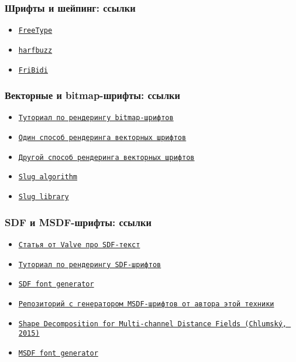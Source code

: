 \documentclass{beamer}
\begin{document}
\begin{frame}[fragile]
\frametitle{Шрифты и шейпинг: ссылки}
\begin{itemize}
\item \href{https://freetype.org}{\texttt{FreeType}}
\item \href{https://harfbuzz.github.io}{\texttt{harfbuzz}}
\item \href{https://github.com/fribidi/fribidi}{\texttt{FriBidi}}
\end{itemize}
\end{frame}

\begin{frame}[fragile]
\frametitle{Векторные и bitmap-шрифты: ссылки}
\begin{itemize}
\item \href{https://learnopengl.com/In-Practice/Text-Rendering}{\texttt{Туториал по рендерингу bitmap-шрифтов}}
\item \href{https://wdobbie.com/post/gpu-text-rendering-with-vector-textures}{\texttt{Один способ рендеринга векторных шрифтов}}
\item \href{https://medium.com/@evanwallace/easy-scalable-text-rendering-on-the-gpu-c3f4d782c5ac}{\texttt{Другой способ рендеринга векторных шрифтов}}
\item \href{https://jcgt.org/published/0006/02/02}{\texttt{Slug algorithm}}
\item \href{https://sluglibrary.com}{\texttt{Slug library}}
\end{itemize}
\end{frame}

\begin{frame}[fragile]
\frametitle{SDF и MSDF-шрифты: ссылки}
\begin{itemize}
\item \href{https://steamcdn-a.akamaihd.net/apps/valve/2007/SIGGRAPH2007_AlphaTestedMagnification.pdf}{\texttt{Статья от Valve про SDF-текст}}
\item \href{https://blog.mapbox.com/drawing-text-with-signed-distance-fields-in-mapbox-gl-b0933af6f817}{\texttt{Туториал по рендерингу SDF-шрифтов}}
\item \href{https://evanw.github.io/font-texture-generator/}{\texttt{SDF font generator}}
\item \href{https://github.com/Chlumsky/msdfgen}{\texttt{Репозиторий с генератором MSDF-шрифтов от автора этой техники}}
\item \href{https://github.com/Chlumsky/msdfgen/files/3050967/thesis.pdf}{\texttt{Shape Decomposition for Multi-channel Distance Fields (Chlumský, 2015)}}
\item \href{https://msdf-bmfont.donmccurdy.com/}{\texttt{MSDF font generator}}
\end{itemize}
\end{frame}
\end{document}
